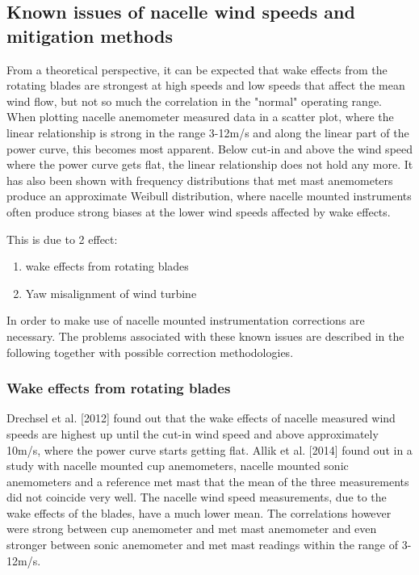 \subsection{Known issues of nacelle wind speeds and mitigation methods}

From a theoretical perspective, it can be expected that wake effects from the rotating blades are strongest at high speeds and low speeds that affect the mean wind flow, but not so much the correlation in the "normal" operating range. When plotting nacelle anemometer measured data in a scatter plot, where the linear relationship is strong in the range 3-12m/s and along the linear part of the power curve, this becomes most apparent. Below cut-in and above the wind speed where the power curve gets flat, the linear relationship does not hold any more. It has also been shown with frequency distributions that met mast anemometers produce an approximate Weibull distribution, where nacelle mounted instruments often produce strong biases at the lower wind speeds affected by wake effects.

This is due to 2 effect:
\begin{enumerate}
    \item wake effects from rotating blades
    \item Yaw misalignment of wind turbine
\end{enumerate}

In order to make use of nacelle mounted instrumentation corrections are necessary. The problems associated with these known issues are described in the following together with possible correction methodologies. 

\subsubsection{Wake effects from rotating blades}
Drechsel et al. [2012] found out that the wake effects of nacelle measured wind speeds are highest up until the cut-in wind speed and above approximately 10m/s, where the power curve starts getting flat.
Allik et al. [2014] found out in a study with nacelle mounted cup anemometers, nacelle mounted sonic anemometers and a reference met mast that the mean of the three measurements did not coincide very well. The nacelle wind speed measurements, due to the wake effects of the blades, have a much lower mean. The correlations however were strong between cup anemometer and met mast anemometer and even stronger between sonic anemometer and met mast readings within the range of 3-12m/s. 

